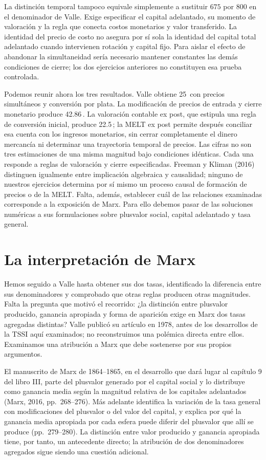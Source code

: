 \documentclass[10pt,twoside]{article}
\newcommand{\pct}{\ifmmode\text{\char37}\else\char37\fi}
\begin{document}
La distinción temporal tampoco equivale simplemente a sustituir $675$ por $800$ en el denominador de Valle. Exige especificar el capital adelantado, su momento de valoración y la regla que conecta costos monetarios y valor transferido. La identidad del precio de costo no asegura por sí sola la identidad del capital total adelantado cuando intervienen rotación y capital fijo. Para aislar el efecto de abandonar la simultaneidad sería necesario mantener constantes las demás condiciones de cierre; los dos ejercicios anteriores no constituyen esa prueba controlada.

Podemos reunir ahora los tres resultados. Valle obtiene 25\,\pct{} con precios simultáneos y conversión por plata. La modificación de precios de entrada y cierre monetario produce 42.86\,\pct. La valoración contable ex post, que estipula una regla de conversión inicial, produce 22.5\,\pct; la MELT ex post permite después conciliar esa cuenta con los ingresos monetarios, sin cerrar completamente el dinero mercancía ni determinar una trayectoria temporal de precios. Las cifras no son tres estimaciones de una misma magnitud bajo condiciones idénticas. Cada una responde a reglas de valoración y cierre especificadas. Freeman y Kliman (2016) distinguen igualmente entre implicación algebraica y causalidad; ninguno de nuestros ejercicios determina por sí mismo un proceso causal de formación de precios o de la MELT. Falta, además, establecer cuál de las relaciones examinadas corresponde a la exposición de Marx. Para ello debemos pasar de las soluciones numéricas a sus formulaciones sobre plusvalor social, capital adelantado y tasa general.



\section{La interpretación de Marx}
Hemos seguido a Valle hasta obtener sus dos tasas, identificado la diferencia entre sus denominadores y comprobado que otras reglas producen otras magnitudes. Falta la pregunta que motivó el recorrido: ¿la distinción entre plusvalor producido, ganancia apropiada y forma de aparición exige en Marx dos tasas agregadas distintas? Valle publicó su artículo en 1978, antes de los desarrollos de la TSSI aquí examinados; no reconstruimos una polémica directa entre ellos. Examinamos una atribución a Marx que debe sostenerse por sus propios argumentos.

El manuscrito de Marx de 1864--1865, en el desarrollo que dará lugar al capítulo 9 del libro III, parte del plusvalor generado por el capital social y lo distribuye como ganancia media según la magnitud relativa de los capitales adelantados (Marx, 2016, pp.~268--276). Más adelante identifica la variación de la tasa general con modificaciones del plusvalor o del valor del capital, y explica por qué la ganancia media apropiada por cada esfera puede diferir del plusvalor que allí se produce (pp.~279--280). La distinción entre valor producido y ganancia apropiada tiene, por tanto, un antecedente directo; la atribución de dos denominadores agregados sigue siendo una cuestión adicional.
\end{document}
